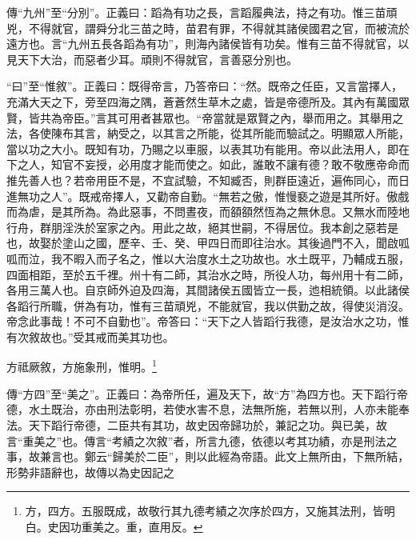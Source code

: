 {\noindent\zhuan{}\fzbyks 傳“九州”至“分別”。正義曰：蹈為有功之長，言蹈履典法，持之有功。惟三苗頑兇，不得就官，謂舜分北三苗之時，苗君有罪，不得就其諸侯國君之官，而被流於遠方也。言“九州五長各蹈為有功”，則海內諸侯皆有功矣。惟有三苗不得就官，以見天下大治，而惡者少耳。頑則不得就官，言善惡分別也。 \par}

{\noindent\shu{}\fzkt “曰”至“惟敘”。正義曰：既得帝言，乃答帝曰：“然。既帝之任臣，又言當擇人，充滿大天之下，旁至四海之隅，蒼蒼然生草木之處，皆是帝德所及。其內有萬國眾賢，皆共為帝臣。”言其可用者甚眾也。“帝當就是眾賢之內，舉而用之。其舉用之法，各使陳布其言，納受之，以其言之所能，從其所能而驗試之。明顯眾人所能，當以功之大小。既知有功，乃賜之以車服，以表其功有能用。帝以此法用人，即在下之人，知官不妄授，必用度才能而使之。如此，誰敢不讓有德？敢不敬應帝命而推先善人也？若帝用臣不是，不宜試驗，不知臧否，則群臣遠近，遍佈同心，而日進無功之人”。既戒帝擇人，又勸帝自勤。“無若之傲，惟慢褻之遊是其所好。傲戲而為虐，是其所為。為此惡事，不問晝夜，而頟頟然恆為之無休息。又無水而陸地行舟，群朋淫泆於室家之內。用此之故，絕其世嗣，不得居位。我本創之惡若是也，故娶於塗山之國，歷辛、壬、癸、甲四日而即往治水。其後過門不入，聞啟呱呱而泣，我不暇入而子名之，惟以大治度水土之功故也。水土既平，乃輔成五服，四面相距，至於五千裡。州十有二師，其治水之時，所役人功，每州用十有二師，各用三萬人也。自京師外迫及四海，其間諸侯五國皆立一長，迆相統領。以此諸侯各蹈行所職，併為有功，惟有三苗頑兇，不能就官，我以供勤之故，得使災消沒。帝念此事哉！不可不自勤也”。帝答曰：“天下之人皆蹈行我德，是汝治水之功，惟有次敘故也。”受其戒而美其功也。 \par}

方祗厥敘，方施象刑，惟明。\footnote{方，四方。五服既成，故敬行其九德考績之次序於四方，又施其法刑，皆明白。史因功重美之。重，直用反。}

{\noindent\zhuan{}\fzbyks 傳“方四”至“美之”。正義曰：為帝所任，遍及天下，故“方”為四方也。天下蹈行帝德，水土既治，亦由刑法彰明，若使水害不息，法無所施，若無以刑，人亦未能奉法。天下蹈行帝德，二臣共有其功，故史因帝歸功於，兼記之功。與已美，故言“重美之”也。傳言“考績之次敘”者，所言九德，依德以考其功績，亦是刑法之事，故兼言也。鄭云“歸美於二臣”，則以此經為帝語。此文上無所由，下無所結，形勢非語辭也，故傳以為史因記之 \par}

